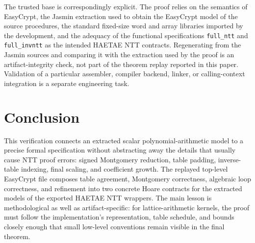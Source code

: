 \documentclass[10pt,twocolumn]{article}
\newcommand{\haetae}{HAETAE}
\newcommand{\ec}{EasyCrypt}
\newcommand{\jasmin}{Jasmin}
\begin{document}
The trusted base is correspondingly explicit. The proof relies on the semantics
of \ec{}, the \jasmin{} extraction used to obtain the \ec{} model of the source
procedures, the standard fixed-size word and array libraries imported by the
development, and the adequacy of the functional specifications
\texttt{full\_ntt} and \texttt{full\_invntt} as the intended \haetae{} NTT
contracts. Regenerating  from the \jasmin{} sources and
comparing it with the extraction used by the proof is an artifact-integrity
check, not part of the theorem replay reported in this paper. Validation of a
particular assembler, compiler backend, linker, or calling-context integration
is a separate engineering task.

\section{Conclusion}

This verification connects an extracted scalar polynomial-arithmetic model to a
precise formal specification without abstracting away the details that usually
cause NTT proof errors: signed Montgomery reduction, table padding,
inverse-table indexing, final scaling, and coefficient growth. The replayed
top-level EasyCrypt file composes table agreement, Montgomery correctness,
algebraic loop correctness, and refinement into two concrete Hoare contracts for
the extracted models of the exported \haetae{} NTT wrappers. The main lesson is methodological
as well as artifact-specific: for lattice-arithmetic kernels, the proof must
follow the implementation's representation, table schedule, and bounds closely
enough that small low-level conventions remain visible in the final theorem.



\end{document}
